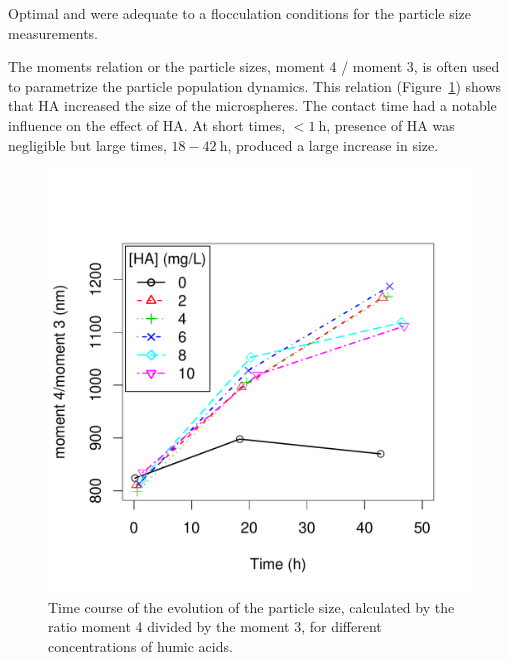 \documentclass[journal=langd5,manuscript=article]{achemso}
\begin{document}
Optimal 
and  %
were adequate to a flocculation conditions for the particle size measurements.










The moments relation or the particle sizes, moment 4 / moment 3,  is often used to
parametrize the particle population dynamics. This relation (Figure~\ref{fgr:moments43})
shows that HA increased the size of the microspheres. The contact time had a notable influence on the effect of HA. At short times,
$< 1~\mathrm{h}$, 
presence of HA was negligible but large times, 
$18 - 42~\mathrm{h}$,
produced a large increase in size.



 \begin{figure}
  \includegraphics[width=\linewidth]{Figures/Moments_34.pdf}
  \caption{Time course of the evolution of the particle size, calculated by the  ratio moment 4 divided by the moment 3, for different concentrations of humic acids.} 
  \label{fgr:moments43}
\end{figure}
\end{document}
